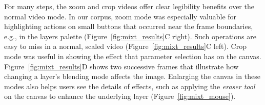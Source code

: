  For many steps, the zoom and crop videos offer clear legibility benefits over the normal video mode. In our corpus, zoom mode was especially valuable for highlighting actions on small buttons that occurred near the frame boundaries, e.g., in the layers palette (Figure~\ref{fig:mixt_results}C right). Such operations are easy to miss in a normal, scaled video (Figure~\ref{fig:mixt_results}C left). Crop mode was useful in showing the effect that parameter selection has on the canvas. Figure~\ref{fig:mixt_results}D shows two successive frames that illustrate how changing a layer's blending mode affects the image. Enlarging the canvas in these modes also helps users see the details of effects, such as applying the \emph{eraser tool} on the canvas to enhance the underlying layer (Figure~\ref{fig:mixt_mouse}).


